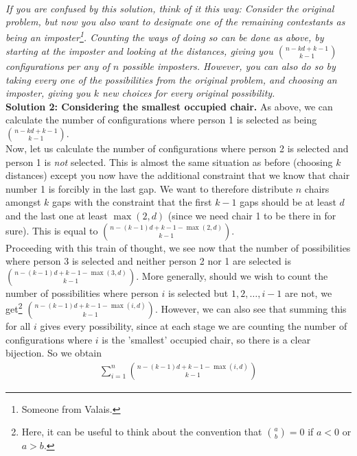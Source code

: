 {\\
\emph{If you are confused by this solution, think of it this way: Consider the original problem, but now you also want to designate one of the remaining contestants as being an imposter\footnote{Someone from Valais.}. Counting the ways of doing so can be done as above, by starting at the imposter and looking at the distances, giving you $\binom{n-kd+k-1}{k-1}$ configurations per any of $n$ possible imposters. However, you can also do so by taking every one of the possibilities from the original problem, and choosing an imposter, giving you $k$ new choices for every original possibility.}\\

\textbf{Solution 2: Considering the smallest occupied chair.} As above, we can calculate the number of configurations where person 1 is selected as being $\binom{n-kd+k-1}{k-1}$.\\ Now, let us calculate the number of configurations where person 2 is selected and person 1 is \emph{not} selected. This is almost the same situation as before (choosing $k$ distances) except you now have the additional constraint that we know that chair number 1 is forcibly in the last gap. We want to therefore distribute $n$ chairs amongst $k$ gaps with the constraint that the first $k-1$ gaps should be at least $d$ and the last one at least $\max(2,d)$ (since we need chair 1 to be there in for sure). This is equal to $\binom{n-(k-1)d+k-1-\max(2,d)}{k-1}$. \\
Proceeding with this train of thought, we see now that the number of possibilities where person 3 is selected and neither person 2 nor 1 are selected is $\binom{n-(k-1)d+k-1-\max(3,d)}{k-1}$. More generally, should we wish to count the number of possibilities where person $i$ is selected but $1, 2, \dots, i-1$ are not, we get\footnote{Here, it can be useful to think about the convention that $\binom{a}{b} = 0$ if $a < 0$ or $a > b$.} $\binom{n-(k-1)d+k-1-\max(i,d)}{k-1}$. However, we can also see that summing this for all $i$ gives every possibility, since at each stage we are counting the number of configurations where $i$ is the 'smallest' occupied chair, so there is a clear bijection. So we obtain 
\begin{align*}
    \sum_{i=1}^{n} \binom{n-(k-1)d+k-1-\max(i,d)}{k-1} 
\end{align*}

\newpage 

}
